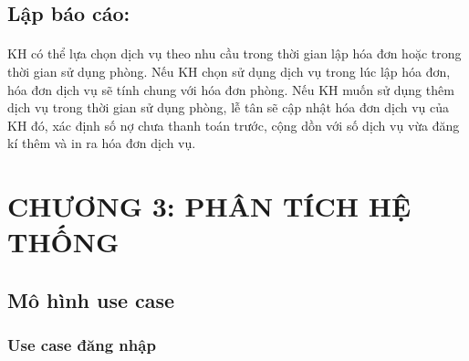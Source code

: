 \documentclass{article}
\begin{document}
\begin{flushleft}
		\fontsize{14}{20}\selectfont
		\subsection{Lập báo cáo:}
		\fontsize{13}{20}\selectfont
	    \paragraph{}
       KH có thể lựa chọn dịch vụ theo nhu cầu trong thời gian lập hóa đơn hoặc trong thời gian sử dụng phòng. Nếu KH chọn sử dụng dịch vụ trong lúc lập hóa đơn, hóa đơn dịch vụ sẽ tính chung với hóa đơn phòng. Nếu KH muốn sử dụng thêm dịch vụ trong thời gian sử dụng phòng, lễ tân sẽ cập nhật hóa đơn dịch vụ của KH đó, xác định số nợ chưa thanh toán trước, cộng dồn với số dịch vụ vừa đăng kí thêm và in ra hóa đơn dịch vụ.
		
		\fontsize{14}{20}\selectfont
		
		\section*{CHƯƠNG 3: PHÂN TÍCH HỆ THỐNG}
		\fontsize{14}{20}\selectfont
		\setcounter{section}{3}
		\subsection{ Mô hình use case }
	
		
		\fontsize{14}{20}\selectfont
		\subsubsection{Use case đăng nhập}
		\fontsize{13}{13}\selectfont


\end{flushleft}
\end{document}
